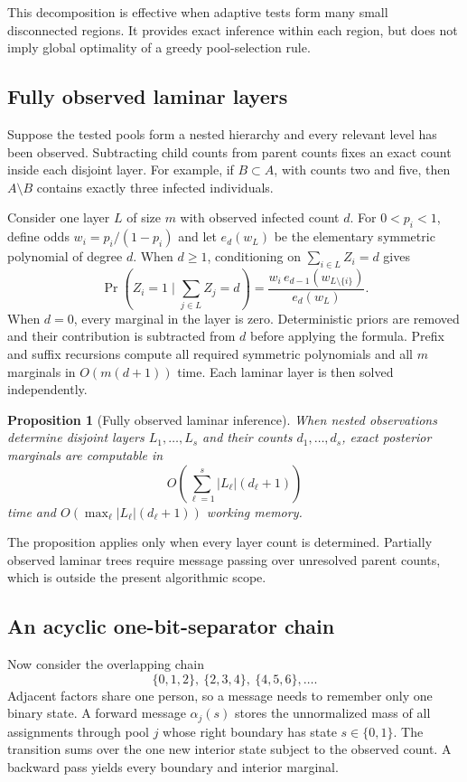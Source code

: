 \documentclass[11pt]{article}
\newtheorem{proposition}{Proposition}
\begin{document}
This decomposition is effective when adaptive tests form many small
disconnected regions. It provides exact inference within each region, but does
not imply global optimality of a greedy pool-selection rule.

\subsection{Fully observed laminar layers}

Suppose the tested pools form a nested hierarchy and every relevant level has
been observed. Subtracting child counts from parent counts fixes an exact count
inside each disjoint layer. For example, if $B\subset A$, with counts two and
five, then $A\setminus B$ contains exactly three infected individuals.

Consider one layer $L$ of size $m$ with observed infected count $d$. For
$0<p_i<1$, define odds $w_i=p_i/(1-p_i)$ and let $e_d(w_L)$ be the elementary
symmetric polynomial of degree $d$. When $d\geq1$, conditioning on
$\sum_{i\in L}Z_i=d$ gives
\[
  \Pr(Z_i=1\mid {\textstyle\sum_{j\in L}} Z_j=d)
  =\frac{w_i\,e_{d-1}(w_{L\setminus\{i\}})}{e_d(w_L)}.
\]
When $d=0$, every marginal in the layer is zero. Deterministic priors are removed
and their contribution is subtracted from $d$ before applying the formula.
Prefix and suffix recursions compute all required symmetric polynomials and all
$m$ marginals in $O(m(d+1))$ time. Each laminar layer is then solved independently.

\begin{proposition}[Fully observed laminar inference]
When nested observations determine disjoint layers $L_1,\ldots,L_s$ and their
counts $d_1,\ldots,d_s$, exact posterior marginals are computable in
\[
  O\!\left(\sum_{\ell=1}^s |L_\ell|(d_\ell+1)\right)
\]
time and $O(\max_\ell |L_\ell|(d_\ell+1))$ working memory.
\end{proposition}

The proposition applies only when every layer count is determined. Partially
observed laminar trees require message passing over unresolved parent counts,
which is outside the present algorithmic scope.

\subsection{An acyclic one-bit-separator chain}

Now consider the overlapping chain
\[
  \{0,1,2\},\ \{2,3,4\},\ \{4,5,6\},\ldots.
\]
Adjacent factors share one person, so a message needs to remember only one
binary state. A forward message $\alpha_j(s)$ stores the unnormalized mass of
all assignments through pool $j$ whose right boundary has state $s\in\{0,1\}$.
The transition sums over the one new interior state subject to the observed
count. A backward pass yields every boundary and interior marginal.
\end{document}
